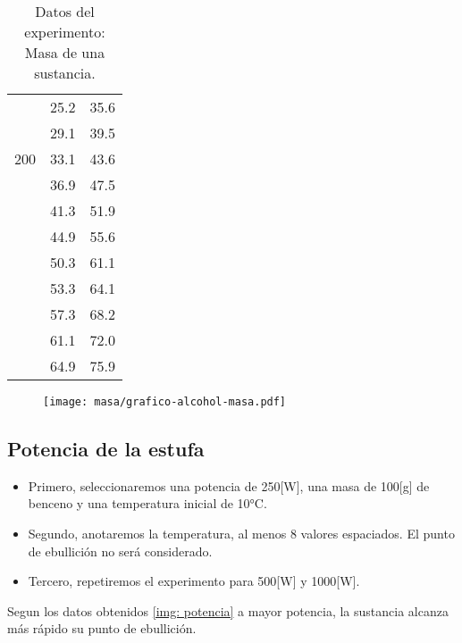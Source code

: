 \documentclass[a4paper, 12p]{article}
\begin{document}
\begin{table}[H]
\begin{tabular}{|c|c|c|}
                  &   25.2       &35.6\\
                  &    29.1      &39.5\\
      200         &    33.1      &43.6\\
                  &    36.9      &47.5\\
                  &    41.3      &51.9\\
                  &    44.9      &55.6\\
                  &    50.3      &61.1\\
                  &    53.3      & 64.1\\
                  &    57.3      & 68.2\\
                  &    61.1      &72.0\\
                  &    64.9      &75.9\\ \hline
      \end{tabular}
      \label{tab:masa }
      \caption[]{Datos del experimento: Masa de una sustancia.}
\end{table}

\begin{figure}[H]
      \centering
      \texttt{[image: masa/grafico-alcohol-masa.pdf]}
      \label{img: masa}
\end{figure}



\subsection{Potencia de la estufa}
\begin{itemize}
      \item Primero, seleccionaremos una potencia de 250[W], una masa de 100[g] de benceno y una temperatura inicial de 10°C.
      \item Segundo, anotaremos la temperatura, al menos 8 valores espaciados. El punto de ebullición no será considerado.
      \item Tercero, repetiremos el experimento para 500[W] y 1000[W].
\end{itemize}
Segun los datos obtenidos \ref{img: potencia} a mayor potencia, la sustancia alcanza más rápido su punto de ebullición.
\end{document}
